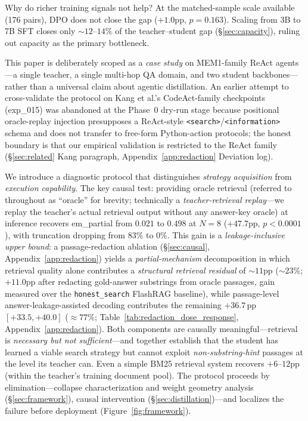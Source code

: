 Why do richer training signals not help? At the matched-sample scale available (176 pairs), DPO does not close the gap ($+1.0$pp, $p = 0.163$). Scaling from 3B to 7B SFT closes only ${\sim}12$--$14\%$ of the teacher--student gap (\S\ref{sec:capacity}), ruling out capacity as the primary bottleneck.

This paper is deliberately scoped as a \emph{case study} on MEM1-family ReAct agents---a single teacher, a single multi-hop QA domain, and two student backbones---rather than a universal claim about agentic distillation. An earlier attempt to cross-validate the protocol on Kang et al.'s CodeAct-family checkpoints~\cite{kang2025agent} (exp\_015) was abandoned at the Phase~0 dry-run stage because positional oracle-replay injection presupposes a ReAct-style \texttt{<search>}/\texttt{<information>} schema and does not transfer to free-form Python-action protocols; the honest boundary is that our empirical validation is restricted to the ReAct family (\S\ref{sec:related} Kang paragraph, Appendix~\ref{app:redaction} Deviation log).

We introduce a diagnostic protocol that distinguishes \emph{strategy acquisition} from \emph{execution capability}. The key causal test: providing oracle retrieval (referred to throughout as ``oracle'' for brevity; technically a \textit{teacher-retrieval replay}---we replay the teacher's actual retrieval output without any answer-key oracle) at inference recovers em\_partial from $0.021$ to $0.498$ at $N\!=\!8$ ($+47.7$pp, $p < 0.0001$), with truncation dropping from 83\% to 0\%. This gain is a \emph{leakage-inclusive upper bound}: a passage-redaction ablation (\S\ref{sec:causal}, Appendix~\ref{app:redaction}) yields a \emph{partial-mechanism} decomposition in which retrieval quality alone contributes a \emph{structural retrieval residual} of ${\sim}11$pp (${\sim}23\%$; $+11.0$pp after redacting gold-answer substrings from oracle passages, gain measured over the \texttt{honest\_search} FlashRAG baseline), while passage-level answer-leakage-assisted decoding contributes the remaining $+36.7$\,pp $[+33.5, +40.0]$ ($\approx 77\%$; Table~\ref{tab:redaction_dose_response}, Appendix~\ref{app:redaction}). Both components are causally meaningful---retrieval is \emph{necessary but not sufficient}---and together establish that the student has learned a viable search strategy but cannot exploit \emph{non-substring-hint} passages at the level its teacher can. Even a simple BM25 retrieval system recovers $+6$--$12$pp (within the teacher's training document pool). The protocol proceeds by elimination---collapse characterization and weight geometry analysis (\S\ref{sec:framework}), causal intervention (\S\ref{sec:distillation})---and localizes the failure before deployment (Figure~\ref{fig:framework}).

